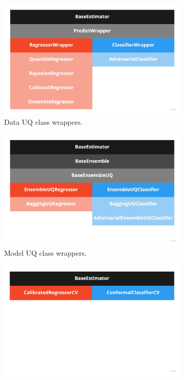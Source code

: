 \begin{figure}[htbp]
     \centering
     \begin{subfigure}[b]{0.32\textwidth}
         \centering
         \includegraphics[width=1.15\textwidth]{figures/implementation/class-data-uq.jpg}
         \caption{Data UQ class wrappers.}
         \label{fig:data-uq-class}
     \end{subfigure}
     \hfill
     \begin{subfigure}[b]{0.32\textwidth}
         \centering
         \includegraphics[width=1.15\textwidth]{figures/implementation/class-model-uq.jpg}
         \caption{Model UQ class wrappers.}
         \label{fig:model-uq-class}
     \end{subfigure}
     \hfill
     \begin{subfigure}[b]{0.32\textwidth}
         \centering
         \includegraphics[width=1.15\textwidth]{figures/implementation/class-calibration.jpg}

\end{subfigure}
\end{figure}
